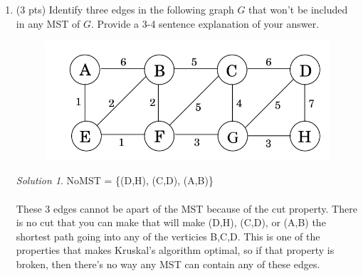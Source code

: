 \documentclass[12pt]{article}
\theoremstyle{remark}
\newtheorem*{solution}{Solution}
\begin{document}
\begin{enumerate}
\item (3 pts) Identify three edges in the following graph $G$ that won't be included in any MST of $G$. Provide a 3-4 sentence explanation of your answer.  
\begin{figure}[h!]
\begin{center}
\includegraphics[scale=0.3]{mst_graph_q2.jpg} 
\end{center}
\end{figure}
\begin{solution}
NoMST = \{(D,H), (C,D), (A,B)\} \\ \\ These 3 edges cannot be apart of the MST because of the cut property. There is no cut that you can make that will make (D,H), (C,D), or (A,B) the shortest path going into any of the verticies B,C,D. This is one of the properties that makes Kruskal's algorithm optimal, so if that property is broken, then there's no way any MST can contain any of these edges.
\end{solution}


\end{enumerate}
\end{document}

